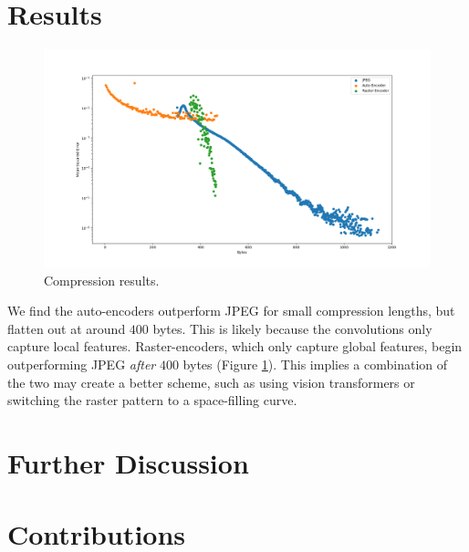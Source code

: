 \documentclass[11pt]{article}
\begin{document}
\section{Results}
\begin{figure}[h]
  \centering
  \includegraphics[width=2\columnwidth]{diagrams/results.png}
  \caption{Compression results.}
  \label{fig:results}
\end{figure}

We find the auto-encoders outperform JPEG for small compression lengths, but flatten out at around $400$ bytes. This is likely because the convolutions only capture local features. Raster-encoders, which only capture global features, begin outperforming JPEG \emph{after} $400$ bytes (Figure \ref{fig:results}). This implies a combination of the two may create a better scheme, such as using vision transformers or switching the raster pattern to a space-filling curve.

\section{Further Discussion}

\section*{Contributions}



\end{document}
